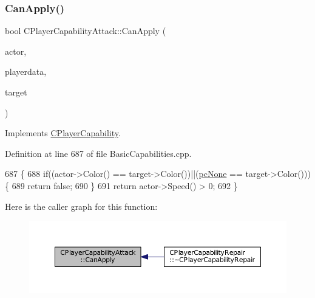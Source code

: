 \hypertarget{classCPlayerCapabilityAttack_ab5cdd55fa3838304fd551426e41f7b17}{}\label{classCPlayerCapabilityAttack_ab5cdd55fa3838304fd551426e41f7b17} 
\subsubsection{\texorpdfstring{Can\+Apply()}{CanApply()}}
{\footnotesize\ttfamily bool C\+Player\+Capability\+Attack\+::\+Can\+Apply (\begin{DoxyParamCaption}\item[{std\+::shared\+\_\+ptr$<$ \hyperlink{classCPlayerAsset}{C\+Player\+Asset} $>$}]{actor,  }\item[{std\+::shared\+\_\+ptr$<$ \hyperlink{classCPlayerData}{C\+Player\+Data} $>$}]{playerdata,  }\item[{std\+::shared\+\_\+ptr$<$ \hyperlink{classCPlayerAsset}{C\+Player\+Asset} $>$}]{target }\end{DoxyParamCaption})\hspace{0.3cm}{\ttfamily [virtual]}}



Implements \hyperlink{classCPlayerCapability_ae96263e0950f496492f8baeb877b9554}{C\+Player\+Capability}.



Definition at line 687 of file Basic\+Capabilities.\+cpp.


\begin{DoxyCode}
687                                                                                                            
                                                   \{
688     \textcolor{keywordflow}{if}((actor->Color() == target->Color())||(\hyperlink{GameDataTypes_8h_aafb0ca75933357ff28a6d7efbdd7602fa88767aa8e02c7b3192bbab4127b3d729}{pcNone} == target->Color()))\{
689         \textcolor{keywordflow}{return} \textcolor{keyword}{false};   
690     \}
691     \textcolor{keywordflow}{return} actor->Speed() > 0;
692 \}
\end{DoxyCode}
Here is the caller graph for this function\+:\nopagebreak
\begin{figure}[H]
\begin{center}
\leavevmode
\includegraphics[width=350pt]{classCPlayerCapabilityAttack_ab5cdd55fa3838304fd551426e41f7b17_icgraph}
\end{center}
\end{figure}
\hypertarget{classCPlayerCapabilityAttack_ab1cda67a8e637a90accf03d1581d4072}{}\label{classCPlayerCapabilityAttack_ab1cda67a8e637a90accf03d1581d4072} 
